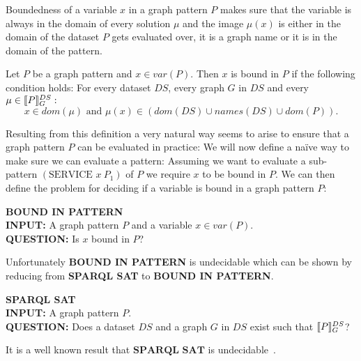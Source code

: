 Boundedness of a variable $x$ in a graph pattern $P$ makes sure that the
variable is always in the domain of every solution $\mu$ and the image $\mu(x)$ is either in the 
domain of the dataset $P$ gets evaluated over, it is a graph name or it is in the domain of the pattern.

\begin{definition}
Let $P$ be a graph pattern and $x \in var(P)$. Then $x$ is bound in $P$ if the
following condition holds:
For every dataset $DS$, every graph $G$ in $DS$ 
and every $\mu \in \llbracket P \rrbracket^{DS}_G:$\\
\[ x \in dom(\mu) \mbox{ and } \mu(x) \in (dom(DS) \cup names(DS) \cup dom(P)). \]
\end{definition}

Resulting from this definition a very natural way seems to arise to ensure that
a graph pattern $P$ can be evaluated in practice: 
We will now define a na\"ive way to make sure we can evaluate a pattern:
Assuming we want to evaluate a sub-pattern $(\mbox{SERVICE } x \ P_1)$ of $P$
we require $x$ to be bound in $P$. We can then define the problem for deciding if a variable
is bound in a graph pattern $P$:

\begin{framed}\noindent \textbf{BOUND IN PATTERN}\\
	\textbf{INPUT:} A graph pattern $P$ and a variable $x \in var(P)$.\\
	\textbf{QUESTION:} Is $x$ bound in $P$?
\end{framed}
Unfortunately \textbf{BOUND IN PATTERN} is undecidable which can be shown by
reducing from \textbf{SPARQL SAT} to \textbf{BOUND IN PATTERN}.
\begin{framed}\noindent \textbf{SPARQL SAT}\\
	\textbf{INPUT:} A graph pattern $P$.\\
	\textbf{QUESTION:} Does a dataset $DS$ and a graph $G$ in $DS$ exist such
	that $\llbracket P \rrbracket^{DS}_G$?
\end{framed}
It is a well known result that $\textbf{SPARQL SAT}$ is undecidable~\cite{angles2008expressive}.

